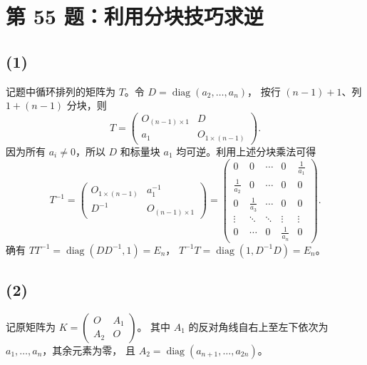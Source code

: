 \documentclass[11pt,a4paper,fontset=fandol]{ctexart}
\newcommand{\ans}[1]{\boxed{#1}}
\newcommand{\diag}{\operatorname{diag}}
\newcommand{\problem}[1]{\Needspace{8\baselineskip}\section*{#1}}
\begin{document}
\newpage
\problem{第 55 题：利用分块技巧求逆}
\subsection*{(1)}
记题中循环排列的矩阵为 $T$。令 $D=\diag(a_2,\ldots,a_n)$，
按行 $(n-1)+1$、列 $1+(n-1)$ 分块，则
\[
T=\begin{pmatrix}O_{(n-1)\times1}&D\\a_1&O_{1\times(n-1)}\end{pmatrix}.
\]
因为所有 $a_i\ne0$，所以 $D$ 和标量块 $a_1$ 均可逆。利用上述分块乘法可得
\[
\ans{T^{-1}=
\begin{pmatrix}O_{1\times(n-1)}&a_1^{-1}\\D^{-1}&O_{(n-1)\times1}\end{pmatrix}
=\begin{pmatrix}
0&0&\cdots&0&\frac1{a_1}\\
\frac1{a_2}&0&\cdots&0&0\\
0&\frac1{a_3}&\cdots&0&0\\
\vdots&\ddots&\ddots&\vdots&\vdots\\
0&\cdots&0&\frac1{a_n}&0
\end{pmatrix}}.
\]
确有 $TT^{-1}=\diag(DD^{-1},1)=E_n$，
$T^{-1}T=\diag(1,D^{-1}D)=E_n$。

\subsection*{(2)}
记原矩阵为 $K=\left(\begin{smallmatrix}O&A_1\\A_2&O\end{smallmatrix}\right)$。
其中 $A_1$ 的反对角线自右上至左下依次为 $a_1,\ldots,a_n$，其余元素为零，
且 $A_2=\diag(a_{n+1},\ldots,a_{2n})$。
\end{document}
